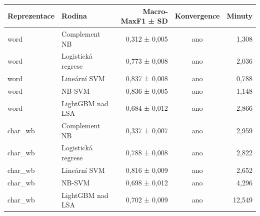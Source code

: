 \begin{tabular}{llrcr}
\toprule
Reprezentace & Rodina & Macro-MaxF1 ± SD & Konvergence & Minuty\\
\midrule
word & Complement NB & 0,312 ± 0,005 & ano & 1,308\\
word & Logistická regrese & 0,773 ± 0,008 & ano & 2,036\\
word & Lineární SVM & 0,837 ± 0,008 & ano & 0,788\\
word & NB-SVM & 0,836 ± 0,005 & ano & 1,148\\
word & LightGBM nad LSA & 0,684 ± 0,012 & ano & 2,866\\
char\_wb & Complement NB & 0,337 ± 0,007 & ano & 2,959\\
char\_wb & Logistická regrese & 0,788 ± 0,008 & ano & 2,822\\
char\_wb & Lineární SVM & 0,816 ± 0,009 & ano & 2,652\\
char\_wb & NB-SVM & 0,698 ± 0,012 & ano & 4,296\\
char\_wb & LightGBM nad LSA & 0,702 ± 0,009 & ano & 12,549\\
\bottomrule
\end{tabular}

